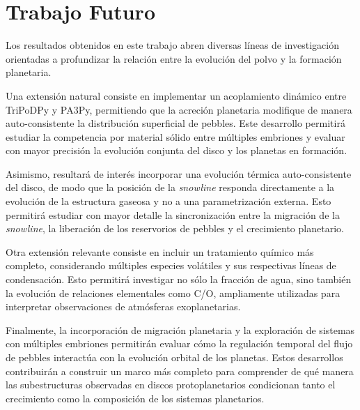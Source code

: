 \section{Trabajo Futuro}

Los resultados obtenidos en este trabajo abren diversas líneas de investigación orientadas a profundizar la relación entre la evolución del polvo y la formación planetaria.

Una extensión natural consiste en implementar un acoplamiento dinámico entre TriPoDPy y PA3Py, permitiendo que la acreción planetaria modifique de manera auto-consistente la distribución superficial de pebbles. Este desarrollo permitirá estudiar la competencia por material sólido entre múltiples embriones y evaluar con mayor precisión la evolución conjunta del disco y los planetas en formación.

Asimismo, resultará de interés incorporar una evolución térmica auto-consistente del disco, de modo que la posición de la \textit{snowline} responda directamente a la evolución de la estructura gaseosa y no a una parametrización externa. Esto permitirá estudiar con mayor detalle la sincronización entre la migración de la \textit{snowline}, la liberación de los reservorios de pebbles y el crecimiento planetario.

Otra extensión relevante consiste en incluir un tratamiento químico más completo, considerando múltiples especies volátiles y sus respectivas líneas de condensación. Esto permitirá investigar no sólo la fracción de agua, sino también la evolución de relaciones elementales como C/O, ampliamente utilizadas para interpretar observaciones de atmósferas exoplanetarias.

Finalmente, la incorporación de migración planetaria y la exploración de sistemas con múltiples embriones permitirán evaluar cómo la regulación temporal del flujo de pebbles interactúa con la evolución orbital de los planetas. Estos desarrollos contribuirán a construir un marco más completo para comprender de qué manera las subestructuras observadas en discos protoplanetarios condicionan tanto el crecimiento como la composición de los sistemas planetarios.

